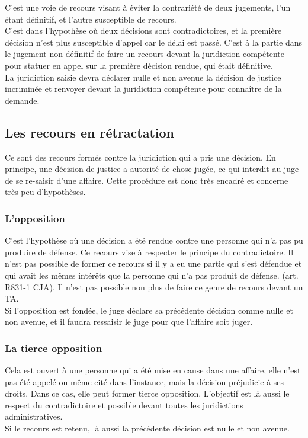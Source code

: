 \documentclass[10pt, a4paper, openany]{book}
\begin{document}
C'est une voie de recours visant à éviter la contrariété de deux jugements, l'un étant définitif, et l'autre susceptible de recours. \\
C'est dans l'hypothèse où deux décisions sont contradictoires, et la première décision n'est plus susceptible d'appel car le délai est passé. C'est à la partie dans le jugement non définitif de faire un recours devant la juridiction compétente pour statuer en appel sur la première décision rendue, qui était définitive. \\
La juridiction saisie devra déclarer nulle et non avenue la décision de justice incriminée et renvoyer devant la juridiction compétente pour connaître de la demande. 

\subsection{Les recours en rétractation}

Ce sont des recours formés contre la juridiction qui a pris une décision. En principe, une décision de justice a autorité de chose jugée, ce qui interdit au juge de se re-saisir d'une affaire. Cette procédure est donc très encadré et concerne très peu d'hypothèses. 

\subsubsection{L'opposition}

C'est l'hypothèse où une décision a été rendue contre une personne qui n'a pas pu produire de défense. Ce recours vise à respecter le principe du contradictoire. Il n'est pas possible de former ce recours si il y a eu une partie qui s'est défendue et qui avait les mêmes intérêts que la personne qui n'a pas produit de défense. (art. R831-1 CJA). Il n'est pas possible non plus de faire ce genre de recours devant un TA. \\
Si l'opposition est fondée, le juge déclare sa précédente décision comme nulle et non avenue, et il faudra ressaisir le juge pour que l'affaire soit juger. 

\subsubsection{La tierce opposition}

Cela est ouvert à une personne qui a été mise en cause dans une affaire, elle n'est pas été appelé ou même cité dans l'instance, mais la décision préjudicie à ses droits. Dans ce cas, elle peut former tierce opposition. L'objectif est là aussi le respect du contradictoire et possible devant toutes les juridictions administratives. \\
Si le recours est retenu, là aussi la précédente décision est nulle et non avenue. 
\end{document}
